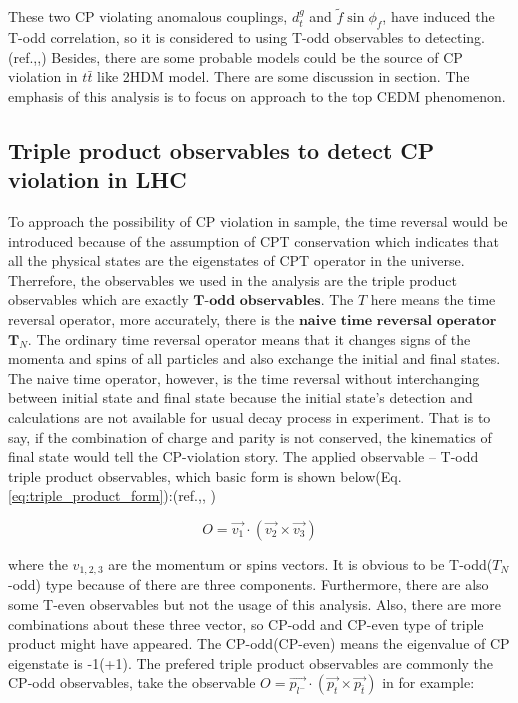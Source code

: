 		These two CP violating anomalous couplings, $d_t^g$ and $\widetilde{f} \sin{\phi_f}$, have induced the T-odd correlation, so it is considered to using T-odd observables to detecting.(ref.\cite{PhysRevD.81.034013},\cite{PhysRevD.79.013013},\cite{PhysRevD.80.034013}) Besides, there are some probable models could be the source of CP violation in $t\bar{t}$ like 2HDM model. There are some discussion in section. The emphasis of this analysis is to focus on approach to the top CEDM phenomenon.


	\subsection{Triple product observables to detect CP violation in LHC}
	\label{ssec:Intro_TPinLHC}


		To approach the possibility of CP violation in sample, the time reversal would be introduced because of the assumption of CPT conservation which indicates that all the physical states are the eigenstates of CPT operator in the universe. Therrefore, the observables we used in the analysis are the triple product observables which are exactly $\textbf{T-odd observables}$. The $T$ here means the time reversal operator, more accurately, there is the $\textbf{naive time reversal operator}$ $\textbf{T}_N$. The ordinary time reversal operator means that it changes signs of the momenta and spins of all particles and also exchange the initial and final states. The naive time operator, however, is the time reversal without interchanging between initial state and final state because the initial state's detection and calculations are not available for usual decay process in experiment. That is to say, if the combination of charge and parity is not conserved, the kinematics of final state would tell the CP-violation story. The applied observable -- T-odd triple product observables, which basic form is shown below(Eq.\ref{eq:triple_product_form}):(ref.\cite{PhysRevLett.58.451},\cite{PhysRevD.80.034013}, )

		\begin{equation}
		O = \vec{v_{1}} \cdot ( \vec{v_2} \times \vec{v_{3}} )
		\label{eq:triple_product_form}
		\end{equation}
		\FloatBarrier

		where the $v_{1,2,3}$ are the momentum or spins vectors. It is obvious to be T-odd($T_{N}$-odd) type because of there are three components. Furthermore, there are also some T-even observables but not the usage of this analysis. Also, there are more combinations about these three vector, so CP-odd and CP-even type of triple product might have appeared. The CP-odd(CP-even) means the eigenvalue of CP eigenstate is -1(+1). The prefered triple product observables are commonly the CP-odd observables, take the observable $O = \vec{p_{l^-}} \cdot ( \vec{p_{t}} \times \vec{p_{\bar{t}}} )$ in \cite{PhysRevLett.58.451} for example:

